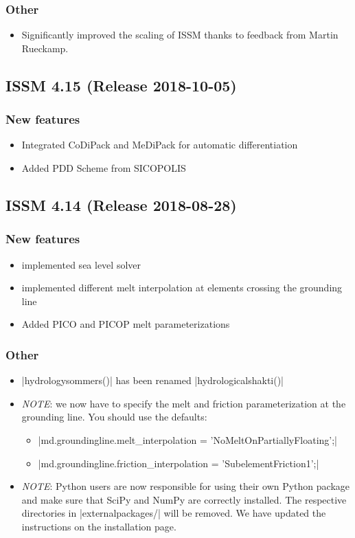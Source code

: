 \subsubsection{Other}
\begin{itemize}
\item Significantly improved the scaling of ISSM thanks to feedback from Martin Rueckamp.
\end{itemize}

\subsection*{ISSM 4.15 (Release 2018-10-05)}
\subsubsection{New features}
\begin{itemize}
\item Integrated CoDiPack and MeDiPack for automatic differentiation
\item Added PDD Scheme from SICOPOLIS
\end{itemize}

\subsection*{ISSM 4.14 (Release 2018-08-28)}
\subsubsection{New features}
\begin{itemize}
\item implemented sea level solver
\item implemented different melt interpolation at elements crossing the grounding line
\item Added PICO and PICOP melt parameterizations
\end{itemize}
\subsubsection{Other}
\begin{itemize}
\item \lstinlinebg|hydrologysommers()| has been renamed \lstinlinebg|hydrologicalshakti()|
\item \emph{NOTE}: we now have to specify the melt and friction parameterization at the grounding line. You should use the defaults:
\begin{itemize}
\item \lstinlinebg|md.groundingline.melt_interpolation = 'NoMeltOnPartiallyFloating';|
\item \lstinlinebg|md.groundingline.friction_interpolation = 'SubelementFriction1';|
\end{itemize}
\item \emph{NOTE}: Python users are now responsible for using their own Python package and make sure that SciPy and NumPy are correctly installed. The respective directories in \lstinlinebg|externalpackages/| will be removed. We have updated the instructions on the installation page.
\end{itemize}

